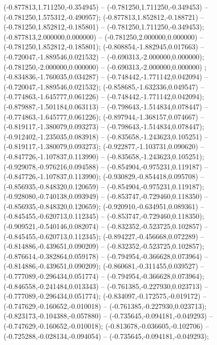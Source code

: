  (-0.877813,1.711250,-0.354945) -- (-0.781250,1.711250,-0.349453) -- (-0.781250,1.575312,-0.490957);
 (-0.877813,1.852812,-0.188721) -- (-0.781250,1.852812,-0.185801) -- (-0.781250,1.711250,-0.349453);
 (-0.877813,2.000000,0.000000) -- (-0.781250,2.000000,0.000000) -- (-0.781250,1.852812,-0.185801);
 (-0.808854,-1.882945,0.017663) -- (-0.720047,-1.889546,0.021532) -- (-0.690313,-2.000000,0.000000);
 (-0.781250,-2.000000,0.000000) -- (-0.690313,-2.000000,0.000000) ;
 (-0.834836,-1.760035,0.034287) -- (-0.748442,-1.771142,0.042094) -- (-0.720047,-1.889546,0.021532);
 (-0.858685,-1.632336,0.049547) -- (-0.774863,-1.645777,0.061226) -- (-0.748442,-1.771142,0.042094);
 (-0.879887,-1.501184,0.063113) -- (-0.798643,-1.514834,0.078447) -- (-0.774863,-1.645777,0.061226);
 (-0.897944,-1.368157,0.074667) -- (-0.819117,-1.380079,0.093273) -- (-0.798643,-1.514834,0.078447);
 (-0.912402,-1.235035,0.083918) -- (-0.835658,-1.243623,0.105251) -- (-0.819117,-1.380079,0.093273);
 (-0.922877,-1.103731,0.090620) -- (-0.847726,-1.107837,0.113990) -- (-0.835658,-1.243623,0.105251);
 (-0.929078,-0.976216,0.094588) -- (-0.854904,-0.975231,0.119187) -- (-0.847726,-1.107837,0.113990);
 (-0.930829,-0.854418,0.095708) -- (-0.856935,-0.848320,0.120659) -- (-0.854904,-0.975231,0.119187);
 (-0.928080,-0.740138,0.093949) -- (-0.853747,-0.729460,0.118350) -- (-0.856935,-0.848320,0.120659);
 (-0.920910,-0.634951,0.089361) -- (-0.845455,-0.620713,0.112345) -- (-0.853747,-0.729460,0.118350);
 (-0.909521,-0.540146,0.082074) -- (-0.832352,-0.523725,0.102857) -- (-0.845455,-0.620713,0.112345);
 (-0.894227,-0.456668,0.072289) -- (-0.814886,-0.439651,0.090209) -- (-0.832352,-0.523725,0.102857);
 (-0.876614,-0.382864,0.059178) -- (-0.794954,-0.366628,0.073964) -- (-0.814886,-0.439651,0.090209);
 (-0.860681,-0.311455,0.039527) -- (-0.777089,-0.296434,0.051774) -- (-0.794954,-0.366628,0.073964);
 (-0.846558,-0.241484,0.013343) -- (-0.761385,-0.227930,0.023713) -- (-0.777089,-0.296434,0.051774);
 (-0.834097,-0.172575,-0.019172) -- (-0.747629,-0.160652,-0.010018) -- (-0.761385,-0.227930,0.023713);
 (-0.823173,-0.104388,-0.057880) -- (-0.735645,-0.094181,-0.049293) -- (-0.747629,-0.160652,-0.010018);
 (-0.813678,-0.036605,-0.102706) -- (-0.725288,-0.028134,-0.094054) -- (-0.735645,-0.094181,-0.049293);
